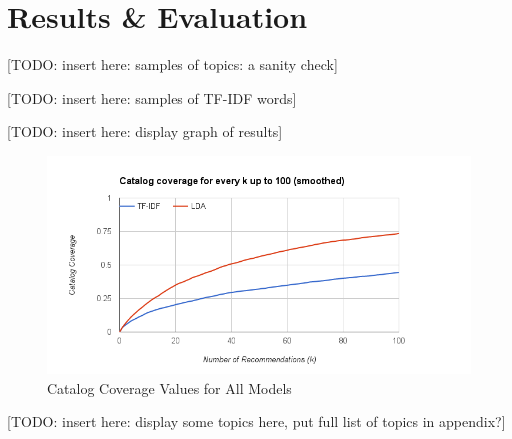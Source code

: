 \chapter{Results \& Evaluation} \label{chp:chapter3}

[TODO: insert here: samples of topics: a sanity check]

[TODO: insert here: samples of TF-IDF words]

[TODO: insert here: display graph of results]

\begin{figure}[hhhhhtb]
	\centering
		\includegraphics[width=5.5in,natwidth=510,natheight=642]{figures/catalog_coverage_0_100.png}
		\caption[Catalog Coverage Values for All Models]{
			Catalog Coverage Values for All Models
		}
	\label{fig:catalog_coverage_0_100}
\end{figure}

[TODO: insert here: display some topics here, put full list of topics in appendix?]
